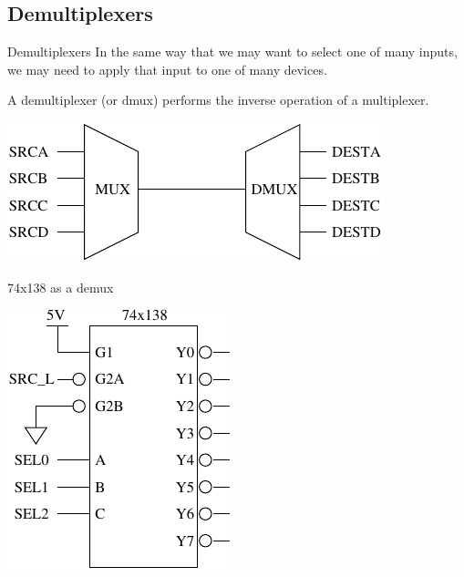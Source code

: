 \subsection{Demultiplexers}

\begin{frame}{Demultiplexers}
  In the same way that we may want to select one of many inputs, we may need to apply that input to one of many devices.
  \begin{definition}
    A \alert{demultiplexer} (or dmux) performs the inverse operation of a multiplexer.
  \end{definition}
  \begin{center}
    \includegraphics{MuxDmux}
  \end{center}
\end{frame}

\begin{frame}{74x138 as a demux}
  \begin{center}
    \includegraphics{74x138DMuxSchematic}
  \end{center}
\end{frame}

